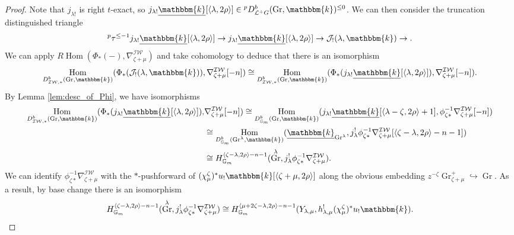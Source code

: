 \documentclass{amsart}
\renewcommand{\L}{\mathcal{L}}
\newcommand{\G}{\mathbb{G}}
\renewcommand{\k}{\mathbbm{k}}
\newcommand{\scrJ}{\mathcal{J}}
\newcommand{\IW}{\mathcal{IW}}
\DeclareMathOperator{\Hom}{Hom}
\newcommand{\uk}{\underline{\k}}
\DeclareMathOperator{\Gr}{Gr}
\theoremstyle{definition}
\begin{document}
    \begin{proof}
        Note that $j_{\lambda !}$ is right $t$-exact, so $j_{\lambda !} \uk [\langle \lambda, 2\rho \rangle] \in {}^p D_{\L^+ G}^b (\Gr, \k)^{\leq 0}$.
        We can then consider the truncation distinguished triangle
        \[{}^p \tau^{\leq -1} j_{\lambda !} \uk [\langle \lambda, 2\rho \rangle] \to j_{\lambda !} \uk [\langle \lambda, 2\rho \rangle] \to \scrJ_! (\lambda, \k) \to.\]
        We can apply $R\Hom (\Phi_* (-), \nabla_{\zeta + \mu}^{\IW})$ and take cohomology to deduce that there is an isomorphism
        \[\Hom_{D_{\IW, *}^b (\Gr, \k)} (\Phi_* (\scrJ_! (\lambda, \k)), \nabla_{\zeta + \mu}^{\IW} [-n]) \cong \Hom_{D_{\IW, *}^b (\Gr, \k)} (\Phi_* (j_{\lambda !} \uk [\langle \lambda, 2\rho \rangle]), \nabla_{\zeta + \mu}^{\IW} [-n]). \]
         By Lemma \ref{lem:desc_of_Phi}, we have isomorphisms
         \begin{align*}
         \Hom_{D_{\IW, *}^b (\Gr, \k)} (\Phi_* (j_{\lambda !} \uk [\langle \lambda, 2\rho \rangle]), &\nabla_{\zeta + \mu}^{\IW} [-n]) \cong \Hom_{D_{\G_m}^b (\Gr, \k)} ( j_{\lambda !} \uk [\langle \lambda - \zeta, 2\rho \rangle + 1],  \phi_{\zeta *}^{-1} \nabla_{\zeta + \mu}^{\IW} [-n])          \\
         &\cong \Hom_{D_{\G_m}^b (\Gr^{\lambda}, \k)} (\uk_{\Gr^{\lambda}},  j_{\lambda}^! \phi_{\zeta *}^{-1} \nabla_{\zeta + \mu}^{\IW} [\langle \zeta - \lambda, 2\rho \rangle - n - 1]) \\
         &\cong H_{\G_m}^{\langle \zeta - \lambda, 2\rho \rangle - n - 1} (\Gr^{\lambda}, j_{\lambda}^! \phi_{\zeta *}^{-1} \nabla_{\zeta + \mu}^{\IW}).
         \end{align*}
         We can identify $\phi_{\zeta *}^{-1} \nabla_{\zeta + \mu}^{\IW}$ with the $*$-pushforward of $(\chi_{\mu}^{\zeta})^* u_! \k [\langle \zeta + \mu, 2\rho \rangle]$ along the obvious embedding $z^{-\zeta} \Gr_{\zeta + \mu}^+ \hookrightarrow \Gr$.
         As a result, by base change there is an isomorphism
         \[H_{\G_m}^{\langle \zeta - \lambda, 2\rho \rangle - n - 1} (\Gr^{\lambda}, j_{\lambda}^! \phi_{\zeta *}^{-1} \nabla_{\zeta + \mu}^{\IW}) \cong H_{\G_m}^{\langle \mu + 2\zeta - \lambda, 2\rho \rangle - n - 1} (Y_{\lambda, \mu}, h_{\lambda, \mu}^! (\chi_{\mu}^{\zeta})^* u_! \k). \]


\end{proof}
\end{document}
